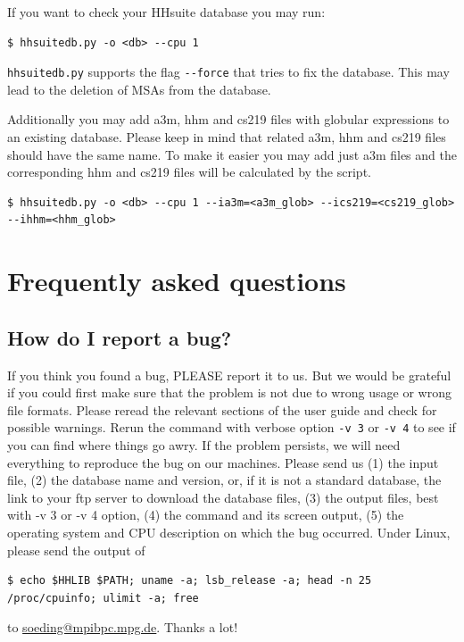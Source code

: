 \documentclass[11pt,a4paper]{article}
\begin{document}
If you want to check your HHsuite database you may run:
\begin{verbatim}
$ hhsuitedb.py -o <db> --cpu 1
\end{verbatim}

\verb`hhsuitedb.py` supports the flag \verb`--force` that tries to fix the database.
This may lead to the deletion of MSAs from the database.

Additionally you may add a3m, hhm and cs219 files with globular expressions to an existing database.
Please keep in mind that related a3m, hhm and cs219 files should have the same name. To make it easier
you may add just a3m files and the corresponding hhm and cs219 files will be calculated by the script.
\begin{verbatim}
$ hhsuitedb.py -o <db> --cpu 1 --ia3m=<a3m_glob> --ics219=<cs219_glob> --ihhm=<hhm_glob>
\end{verbatim}

\section{Frequently asked questions}

\subsection{How do I report a bug? \label{report-bug}}
If you think you found a bug, PLEASE report it to us. But we would be grateful if you could first make sure that the problem is not due to wrong usage or wrong file formats. Please reread the relevant sections of the user guide and check for possible warnings. Rerun the command with verbose option \verb`-v 3` or \verb`-v 4` to see if you can find where things go awry. If the problem persists, we will need everything to reproduce the bug on our machines. Please send us (1) the input file, (2) the database name and version, or, if it is not a standard database, the link to your ftp server to download the database files, (3) the output files, best with -v 3 or -v 4 option, (4) the command and its screen output, (5) the operating system and CPU description on which the bug occurred. Under Linux, please send the output of 
\small
\begin{verbatim}
$ echo $HHLIB $PATH; uname -a; lsb_release -a; head -n 25 /proc/cpuinfo; ulimit -a; free
\end{verbatim}
\normalsize
to \url{soeding@mpibpc.mpg.de}. Thanks a lot!
\end{document}
